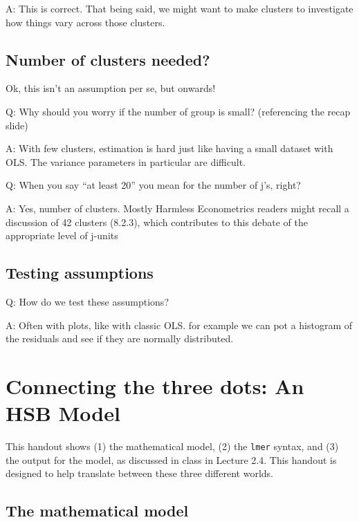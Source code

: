 \documentclass[
  letterpaper,
  DIV=11,
  numbers=noendperiod]{scrreprt}
\begin{document}
A: This is correct. That being said, we might want to make clusters to
investigate how things vary across those clusters.

\hypertarget{number-of-clusters-needed}{%
\section{Number of clusters needed?}\label{number-of-clusters-needed}}

Ok, this isn't an assumption per se, but onwards!

Q: Why should you worry if the number of group is small? (referencing
the recap slide)

A: With few clusters, estimation is hard just like having a small
dataset with OLS. The variance parameters in particular are difficult.

Q: When you say ``at least 20'' you mean for the number of j's, right?

A: Yes, number of clusters. Mostly Harmless Econometrics readers might
recall a discussion of 42 clusters (8.2.3), which contributes to this
debate of the appropriate level of j-units

\hypertarget{testing-assumptions}{%
\section{Testing assumptions}\label{testing-assumptions}}

Q: How do we test these assumptions?

A: Often with plots, like with classic OLS. for example we can pot a
histogram of the residuals and see if they are normally distributed.

\hypertarget{connecting-the-three-dots-an-hsb-model}{%
\chapter{Connecting the three dots: An HSB
Model}\label{connecting-the-three-dots-an-hsb-model}}

This handout shows (1) the mathematical model, (2) the \texttt{lmer}
syntax, and (3) the output for the model, as discussed in class in
Lecture 2.4. This handout is designed to help translate between these
three different worlds.

\hypertarget{the-mathematical-model}{%
\section{The mathematical model}\label{the-mathematical-model}}
\end{document}
